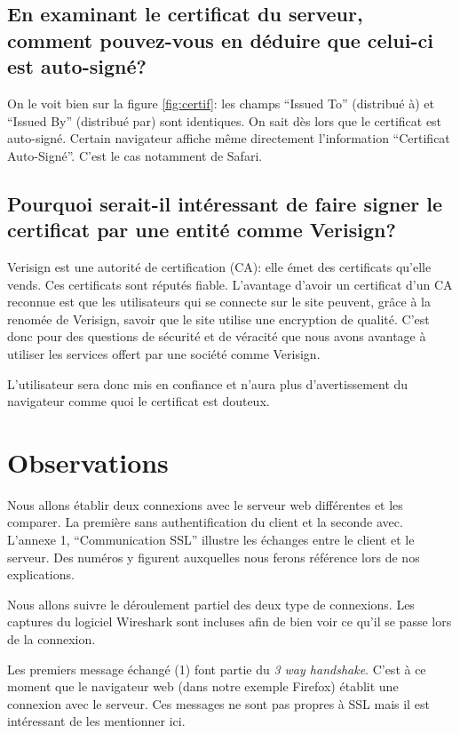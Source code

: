 \documentclass[10pt,a4paper,titlepage]{article}
\begin{document}
\subsection{En examinant le certificat du serveur, comment pouvez-vous en déduire que celui-ci est auto-signé?}

On le voit bien sur la figure \ref{fig:certif}: les champs “Issued To” (distribué à)  et “Issued By” (distribué par) sont identiques. On sait dès lors que le certificat est auto-signé. Certain navigateur affiche même directement l'information “Certificat Auto-Signé”. C'est le cas notamment de Safari.

\subsection{Pourquoi serait-il intéressant de faire signer le certificat par une entité comme Verisign?}

Verisign est une autorité de certification (CA): elle émet des certificats qu'elle vends. Ces certificats sont réputés fiable. L'avantage d'avoir un certificat d'un CA reconnue est que les utilisateurs qui se connecte sur le site peuvent, grâce à la renomée de Verisign, savoir que le site utilise une encryption de qualité. C'est donc pour des questions de sécurité et de véracité que nous avons avantage à utiliser les services offert par une société comme Verisign.

L'utilisateur sera donc mis en confiance et n'aura plus d'avertissement du navigateur comme quoi le certificat est douteux. 

\section{Observations}

Nous allons établir deux connexions avec le serveur web différentes et les comparer. La première sans authentification du client et la seconde avec. L'annexe 1, “Communication SSL” illustre les échanges entre le client et le serveur. Des numéros y figurent auxquelles nous ferons référence lors de nos explications.

Nous allons suivre le déroulement partiel des deux type de connexions. Les captures du logiciel Wireshark sont incluses afin de bien voir ce qu'il se passe lors de la connexion. 

Les premiers message échangé (1) font partie du \emph{3 way handshake}. C'est à ce moment que le navigateur web (dans notre exemple Firefox) établit une connexion avec le serveur. Ces messages ne sont pas propres à SSL mais il est intéressant de les mentionner ici.
\end{document}
